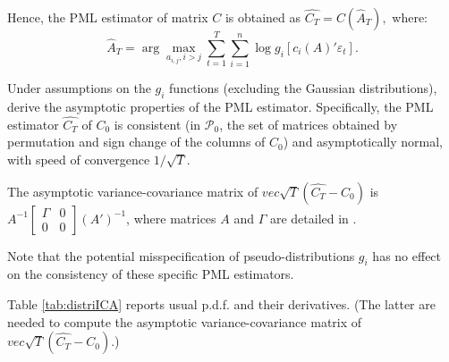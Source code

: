\documentclass[
  12pt,
]{book}
\theoremstyle{definition}
\theoremstyle{definition}
\theoremstyle{definition}
\theoremstyle{definition}
\theoremstyle{remark}
\begin{document}
Hence, the PML estimator of matrix \(C\) is obtained as \(\widehat{C_T} = C(\hat{A}_T),\) where:
\begin{equation}
\hat{A}_T = \arg \max_{a_{i,j}, i>j} \sum^T_{t=1} \sum^n_{i=1} \log g_i [c_i (A)' \varepsilon_t].\label{eq:optimprob2}
\end{equation}

Under assumptions on the \(g_i\) functions (excluding the Gaussian distributions), \citet{Gourieroux_Monfort_Renne_2017} derive the asymptotic properties of the PML estimator. Specifically, the PML estimator \(\widehat{C_T}\) of \(C_0\) is consistent (in \(\mathcal{P}_0\), the set of matrices obtained by permutation and sign change of the columns of \(C_0\)) and asymptotically normal, with speed of convergence \(1/\sqrt{T}\).

The asymptotic variance-covariance matrix of \(vec \sqrt{T} (\widehat{C_T} - C_0)\) is \(A^{-1} \left[\begin{array}{cc} \Gamma & 0 \\ 0 & 0 \end{array} \right] (A')^{-1}\), where matrices \(A\) and \(\Gamma\) are detailed in \citet{Gourieroux_Monfort_Renne_2017}.

Note that the potential misspecification of pseudo-distributions \(g_i\) has no effect on the consistency of these specific PML estimators.

Table \ref{tab:distriICA} reports usual p.d.f. and their derivatives. (The latter are needed to compute the asymptotic variance-covariance matrix of \(vec \sqrt{T} (\widehat{C_T} - C_0)\).)
\end{document}
